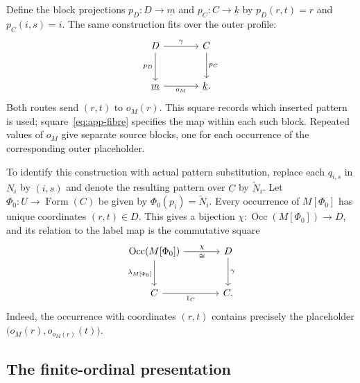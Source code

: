 \documentclass[11pt]{article}
\newcommand{\Occ}{\operatorname{Occ}}
\newcommand{\FormulaSet}{\operatorname{Form}}
\begin{document}
Define the block projections $p_D:D\to\underline m$ and
$p_C:C\to\underline k$ by $p_D(r,t)=r$ and $p_C(i,s)=i$.
The same construction fits over the outer profile:
\begin{equation}\label{eq:app-profile}
\begin{tikzcd}[column sep=large,row sep=large]
 D\arrow[r,"\gamma"]\arrow[d,"p_D"']&C\arrow[d,"p_C"]\\
 \underline m\arrow[r,"o_M"']&\underline k.
\end{tikzcd}
\end{equation}
Both routes send $(r,t)$ to $o_M(r)$. This square records which
inserted pattern is used; square~\eqref{eq:app-fibre} specifies the
map within each such block. Repeated values of $o_M$ give separate
source blocks, one for each occurrence of the corresponding outer
placeholder.

To identify this construction with actual pattern substitution,
replace each $q_{i,s}$ in $N_i$ by $(i,s)$ and denote the resulting
pattern over $C$ by $\widetilde N_i$. Let
$\Phi_0:U\to\FormulaSet(C)$ be given by $\Phi_0(p_i)=\widetilde N_i$.
Every occurrence of $M[\Phi_0]$ has unique coordinates $(r,t)\in D$.
This gives a bijection $\chi:\Occ(M[\Phi_0])\to D$, and its relation
to the label map is the commutative square
\begin{equation}\label{eq:app-occurrence-labels}
\begin{tikzcd}[column sep=large,row sep=large]
 \Occ(M[\Phi_0])\arrow[r,"\chi","\cong"']
    \arrow[d,"\lambda_{M[\Phi_0]}"']&D\arrow[d,"\gamma"]\\
 C\arrow[r,"1_C"']&C.
\end{tikzcd}
\end{equation}
Indeed, the occurrence with coordinates $(r,t)$ contains precisely
the placeholder $\bigl(o_M(r),o_{o_M(r)}(t)\bigr)$.

\subsection{The finite-ordinal presentation}\label{app:ordinals}
\end{document}
